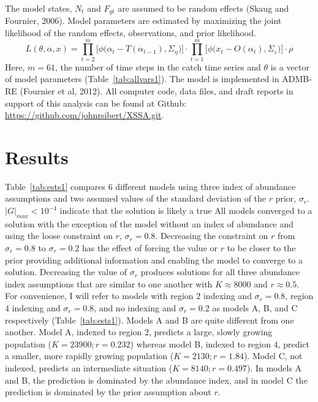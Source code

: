 \documentclass[12pt,letterpaper]{article}
\newcommand\doublespacing{\baselineskip=1.6\normalbaselineskip}
\begin{document}
The model states, $N_t$ and $F_{gt}$ are assumed to be random
effects (Skaug and Fournier, 2006). Model parameters are estimated by
maximizing the joint likelihood of the random
effects, observations, and prior likelihood.
\begin{equation}
\label{eqn:likelihood}
L(\theta,\alpha,x)=
\prod^m_{t=2}\big[\phi\big(\alpha_t-T(\alpha_{t-1}), \Sigma_\eta\big)\big]\cdot
\prod^m_{t=1}\big[\phi\big(x_t-O(\alpha_t),
\Sigma_\varepsilon\big)\big]\cdot\rho
\end{equation}
Here, $m=61$, the number of time steps in the catch time series and
$\theta$ is a vector of model parameters (Table~\ref{tab:allvars1}).
The model is implemented in ADMB-RE (Fournier et al, 2012).
All computer code, data files, and draft reports in support of this
analysis can be found at Github:
\url{https://github.com/johnrsibert/XSSA.git}.

\doublespacing

\section*{Results}
Table~\ref{tab:ests1} compares 6 different models
using three index of abundance assumptions and two 
assumed values of the standard deviation of the $r$ prior, $\sigma_r$. 
$|G|_{max}<10^{-4}$ indicate that the solution is likely a true
All models converged to a solution with the exception of the model
without an index of abundance and using the loose constraint on $r$,
$\sigma_r=0.8$.
Decreasing the constraint on $r$ from $\sigma_r=0.8$ to
$\sigma_r=0.2$ has the effect of forcing the value or $r$ to be closer
to the prior providing additional information and enabling the model
to converge to a solution.
Decreasing the value of $\sigma_r$ produces solutions for all three
abundance index assumptions that are similar to one another with
$K\approx 8000$ and $r\approx 0.5$.
For convenience, I will refer to models with 
region 2 indexing and $\sigma_r=0.8$,
region 4 indexing and $\sigma_r=0.8$, and 
no indexing and $\sigma_r=0.2$
as models A, B, and C respectively (Table~\ref{tab:ests1}).
Models A and B are
quite different from one another. Model A, indexed to region 2, 
predicts a large, slowly growing population ($K=23900; r=0.232$)
whereas model B, indexed to region 4, predict a smaller, more rapidly growing
population ($K = 2130; r=1.84$).
Model C, not indexed, predicts an intermediate situation 
($K=8140; r=0.497$). In models A and B, the prediction is dominated by
the abundance index, and in model C the prediction is dominated by the
prior assumption about $r$.
\end{document}
